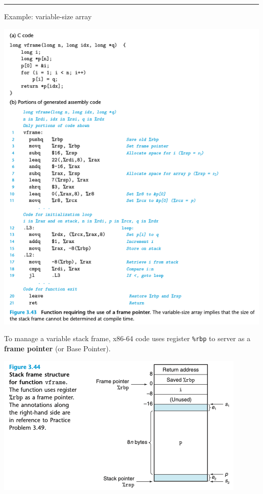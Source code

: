 \documentclass[11pt]{article}
\begin{document}
\noindent\rule{\textwidth}{0.5pt}
Example: variable-size array\\

\begin{center}
\includegraphics[width=.9\linewidth]{pics/vframe.png}
\end{center}

To manage a variable stack frame, x86-64 code uses register \texttt{\%rbp} to server as a \textbf{frame pointer} (or Base Pointer).\\

\begin{center}
\includegraphics[width=.9\linewidth]{pics/stack-frame-structure-for-function-vframe.png}
\end{center}
\end{document}
